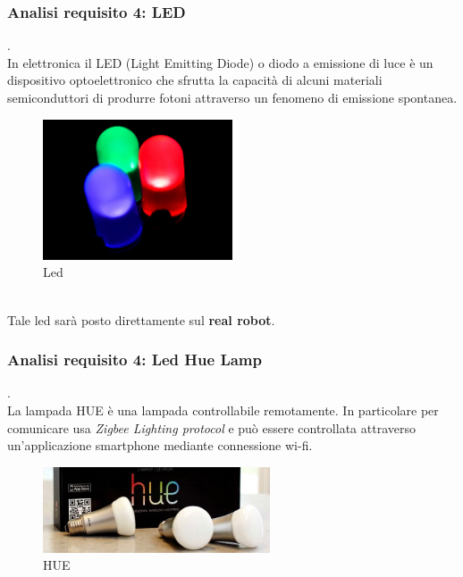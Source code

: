 \documentclass{llncs}
\begin{document}
\subsubsection{Analisi requisito 4: LED}.
\label{ReqAnalysis4LED}
\vspace*{1ex}
\\
In elettronica il LED (Light Emitting Diode) o diodo a emissione di luce \`e un dispositivo optoelettronico che sfrutta la capacit\`a di alcuni materiali semiconduttori di produrre fotoni attraverso un fenomeno di emissione spontanea.
\begin{figure}
    \centering
    \includegraphics[width=0.5\textwidth]{Immagini/led.jpg}
    \caption{Led}
    \label{fig:my_label}
\end{figure}
\\
Tale led sar\`a posto direttamente sul \textbf{real robot}.


\subsubsection{Analisi requisito 4: Led Hue Lamp}.
\label{ReqAnalysis4LHL}
\vspace*{1ex}
\\
La lampada HUE \`e una lampada controllabile remotamente.
In particolare per comunicare usa \textit{Zigbee Lighting protocol} e pu\`o essere controllata attraverso un'applicazione smartphone mediante connessione wi-fi.
\begin{figure}
    \centering
    \includegraphics[width=0.6\textwidth]{Immagini/lampade}
    \caption{HUE}
    \label{fig:my_label}
\end{figure}
\end{document}
